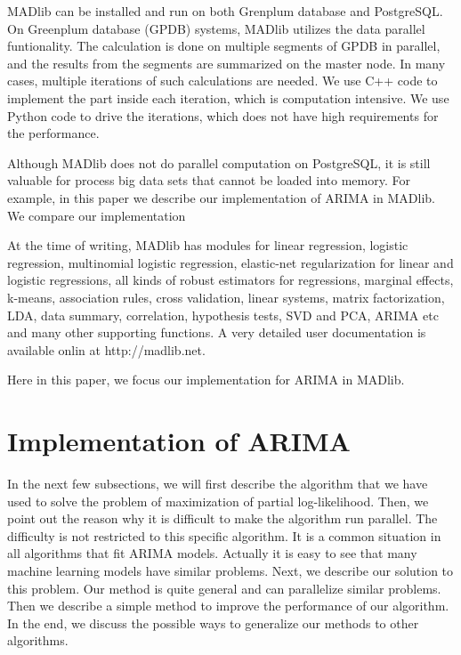\documentclass[english,10pt]{llncs}
\begin{document}
MADlib can be installed and run on both Grenplum database and PostgreSQL\@. On
Greenplum database (GPDB) systems, MADlib utilizes the data parallel
funtionality. The calculation is done on multiple segments of GPDB in parallel,
and the results from the segments are summarized on the master node. In many
cases, multiple iterations of such calculations are needed. We use C++ code to
implement the part inside each iteration, which is computation intensive. We
use Python code to drive the iterations, which does not have high requirements
for the performance.

Although MADlib does not do parallel computation on PostgreSQL, it is
still valuable for process big data sets that cannot be loaded into
memory. For example, in this paper we describe our implementation of
ARIMA in MADlib. We compare our implementation 



At the time of writing, MADlib has modules for linear regression,
logistic regression, multinomial logistic regression, elastic-net
regularization for linear and logistic regressions, all kinds of
robust estimators for regressions, marginal effects, k-means,
association rules, cross validation, linear systems, matrix
factorization, LDA, data summary, correlation, hypothesis tests, SVD
and PCA, ARIMA etc and many other supporting functions.  A very
detailed user documentation is available onlin at http://madlib.net.

Here in this paper, we focus our implementation for ARIMA in MADlib.

\section{Implementation of ARIMA}


In the next few subsections, we will first describe the algorithm that
we have used to solve the problem of maximization of partial
log-likelihood. Then, we point out the reason why it is difficult to
make the algorithm run parallel.  The difficulty is not restricted to
this specific algorithm. It is a common situation in all algorithms
that fit ARIMA models. Actually it is easy to see that many machine
learning models have similar problems. Next, we describe our solution
to this problem. Our method is quite general and can parallelize
similar problems. Then we describe a simple method to improve the
performance of our algorithm. In the end, we discuss the possible ways
to generalize our methods to other algorithms.
\end{document}
